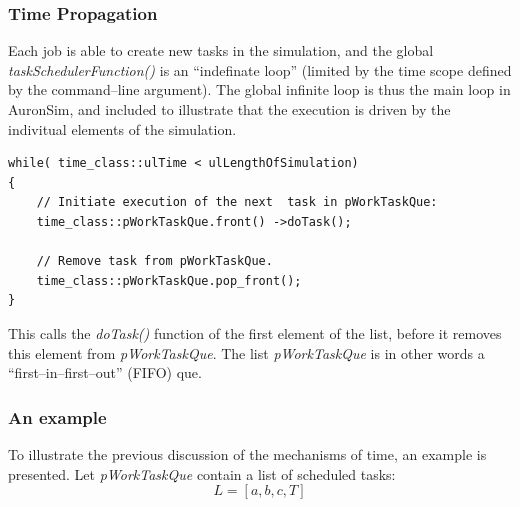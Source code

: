 	\subsubsection{Time Propagation}


%

	Each job is able to create new tasks in the simulation, and the global \emph{taskSchedulerFunction()} is an ``indefinate loop'' (limited by the time scope defined by the command--line argument).
	The global infinite loop is thus the main loop in AuronSim, and included to illustrate that the execution is driven by the indivitual elements of the simulation.

\begin{lstlisting}
while( time_class::ulTime < ulLengthOfSimulation)
{
	// Initiate execution of the next  task in pWorkTaskQue:
	time_class::pWorkTaskQue.front() ->doTask();

	// Remove task from pWorkTaskQue.
	time_class::pWorkTaskQue.pop_front();
}
\end{lstlisting}

	This calls the \emph{doTask()} function of the first element of the list, before it removes this element from \emph{pWorkTaskQue}.
	The list \emph{pWorkTaskQue} is in other words a ``first--in--first--out'' (FIFO) que. %
	
	\subsubsection{An example}
	To illustrate the previous discussion of the mechanisms of time, an example is presented.
	Let \emph{pWorkTaskQue} contain a list of scheduled tasks: %
\begin{equation}
	\nonumber
	L = [a, b, c, T]
\end{equation}

